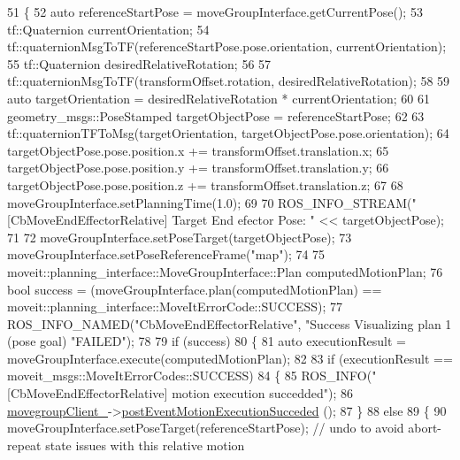 \begin{DoxyCode}
51 \{
52     \textcolor{keyword}{auto} referenceStartPose = moveGroupInterface.getCurrentPose();
53     tf::Quaternion currentOrientation;
54     tf::quaternionMsgToTF(referenceStartPose.pose.orientation, currentOrientation);
55     tf::Quaternion desiredRelativeRotation;
56 
57     tf::quaternionMsgToTF(transformOffset.rotation, desiredRelativeRotation);
58 
59     \textcolor{keyword}{auto} targetOrientation = desiredRelativeRotation * currentOrientation;
60 
61     geometry\_msgs::PoseStamped targetObjectPose = referenceStartPose;
62 
63     tf::quaternionTFToMsg(targetOrientation, targetObjectPose.pose.orientation);
64     targetObjectPose.pose.position.x += transformOffset.translation.x;
65     targetObjectPose.pose.position.y += transformOffset.translation.y;
66     targetObjectPose.pose.position.z += transformOffset.translation.z;
67 
68     moveGroupInterface.setPlanningTime(1.0);
69 
70     ROS\_INFO\_STREAM(\textcolor{stringliteral}{"[CbMoveEndEffectorRelative] Target End efector Pose: "} << targetObjectPose);
71 
72     moveGroupInterface.setPoseTarget(targetObjectPose);
73     moveGroupInterface.setPoseReferenceFrame(\textcolor{stringliteral}{"map"});
74 
75     moveit::planning\_interface::MoveGroupInterface::Plan computedMotionPlan;
76     \textcolor{keywordtype}{bool} success = (moveGroupInterface.plan(computedMotionPlan) == 
      moveit::planning\_interface::MoveItErrorCode::SUCCESS);
77     ROS\_INFO\_NAMED(\textcolor{stringliteral}{"CbMoveEndEffectorRelative"}, \textcolor{stringliteral}{"Success Visualizing plan 1 (pose goal) %
       \textcolor{stringliteral}{"FAILED"});
78 
79     \textcolor{keywordflow}{if} (success)
80     \{
81         \textcolor{keyword}{auto} executionResult = moveGroupInterface.execute(computedMotionPlan);
82 
83         \textcolor{keywordflow}{if} (executionResult == moveit\_msgs::MoveItErrorCodes::SUCCESS)
84         \{
85             ROS\_INFO(\textcolor{stringliteral}{"[CbMoveEndEffectorRelative] motion execution succedded"});
86             \hyperlink{classmoveit__z__client_1_1CbMoveEndEffectorRelative_a5f009b3baaaa47ad3be09d43bab33c07}{movegroupClient\_}->\hyperlink{classmoveit__z__client_1_1ClMoveGroup_ad6b8f0acbe3d11b5c39a83911a3d95b8}{postEventMotionExecutionSucceded}
      ();
87         \}
88         \textcolor{keywordflow}{else}
89         \{
90             moveGroupInterface.setPoseTarget(referenceStartPose); \textcolor{comment}{// undo to avoid abort-repeat state
       issues with this relative motion}
}
\end{DoxyCode}
